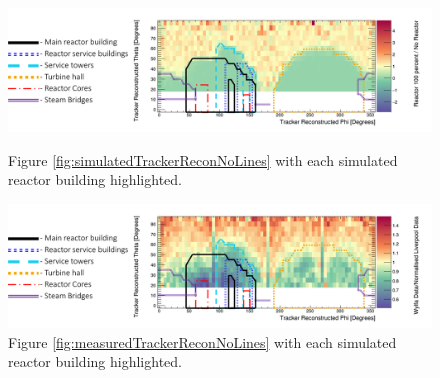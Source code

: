 \begin{figure}
  \centering
    \includegraphics[width=1\linewidth]{Chapter6/Figs/Raster/wylfaSimulatedShadowsWithKey.png}
    \caption{Figure \ref{fig:simulatedTrackerReconNoLines} with each simulated reactor building highlighted.}
  \label{fig:simulatedTrackerRecon}
    \includegraphics[width=1\linewidth]{Chapter6/Figs/Raster/wylfaMeasuredShadowsWithKey.png}
    \caption{Figure \ref{fig:measuredTrackerReconNoLines} with each simulated reactor building highlighted.}
  \label{fig:measuredTrackerRecon}
\end{figure}




